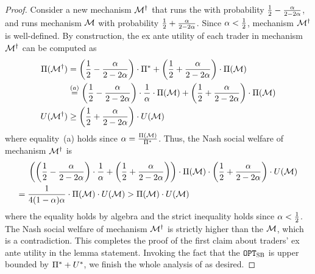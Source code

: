 \begin{proof}
    Consider a new mechanism $\mathcal{M}^\dagger$ that runs the {\SellerOffer} with probability $\frac{1}{2} - \frac{\alpha}{2 - 2 \alpha}$, and runs mechanism $\mathcal{M}$ with probability $\frac{1}{2} + \frac{\alpha}{2 - 2 \alpha}$. Since $\alpha < \frac{1}{2}$, mechanism $\mathcal{M}^\dagger$ is well-defined. By construction, the ex ante utility of each trader in mechanism $\mathcal{M}^\dagger$ can be computed as  
    \begin{align*}
        \Pi(\mathcal{M}^\dagger) &{} = \left(\frac{1}{2} - \frac{\alpha}{2 - 2 \alpha}\right) \cdot \Pi^* + \left(\frac{1}{2} + \frac{\alpha}{2 - 2 \alpha}\right) \cdot \Pi(\mathcal{M})
        \\
        &{} \overset{(a)}{=} 
        \left(\frac{1}{2} - \frac{\alpha}{2 - 2 \alpha}\right) \cdot \frac{1}{\alpha}\cdot \Pi(\mathcal{M}) + \left(\frac{1}{2} + \frac{\alpha}{2 - 2 \alpha}\right) \cdot \Pi(\mathcal{M})    
        \\
        U(\mathcal{M}^\dagger) &{} \geq 
        \left(\frac{1}{2} + \frac{\alpha}{2 - 2 \alpha}\right) \cdot U(\mathcal{M})   
    \end{align*}
    where equality~(a) holds since $\alpha = \frac{\Pi(\mathcal{M})}{\Pi^*}$. Thus, the Nash social welfare of mechanism $\mathcal{M}^\dagger$ is 
    \begin{align*}
        &\left(\left(\frac{1}{2} - \frac{\alpha}{2 - 2 \alpha}\right) \cdot \frac{1}{\alpha} + \left(\frac{1}{2} + \frac{\alpha}{2 - 2 \alpha}\right)
        \right)
        \cdot 
        \Pi(\mathcal{M})
        \cdot 
        \left(\frac{1}{2} + \frac{\alpha}{2 - 2 \alpha}\right) \cdot U(\mathcal{M})
        \\
        ={} &
        \frac{1}{4(1-\alpha)\alpha}
        \cdot \Pi(\mathcal{M}) \cdot 
        U(\mathcal{M})
        > {} 
        \Pi(\mathcal{M}) \cdot 
        U(\mathcal{M})
    \end{align*}
    where the equality holds by algebra and the strict inequality holds since $\alpha < \frac{1}{2}$. The Nash social welfare of mechanism $\mathcal{M}^\dagger$ is strictly higher than the {\NashSocialWelfareMaximizer} $\mathcal{M}$, which is a contradiction. This completes the proof of the first claim about traders' ex ante utility in the lemma statement. Invoking the fact that the {\SecondBest} $\texttt{OPT}_{\textsc{SB}}$ is upper bounded by $\Pi^* + U^*$, we finish the whole analysis of  as desired.
\end{proof}

